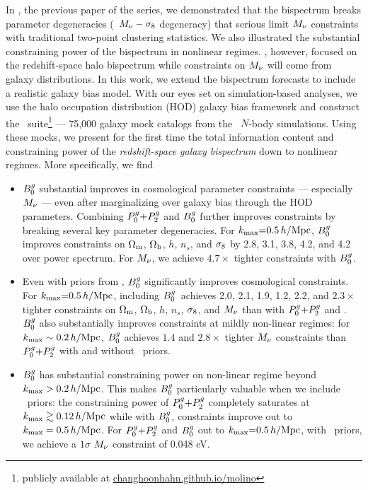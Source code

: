 In \cite{hahn2020}, the previous paper of the series, we demonstrated that the 
bispectrum breaks parameter degeneracies (\eg~$M_\nu-\sigma_8$ degeneracy) that 
serious limit $M_\nu$ constraints with traditional two-point clustering statistics. 
We also illustrated the substantial constraining power of the bispectrum in nonlinear regimes.
\cite{hahn2020}, however, focused on the redshift-space halo bispectrum while 
constraints on $M_\nu$ will come from galaxy distributions. %
In this work, we extend the \cite{hahn2020} bispectrum forecasts to
include a realistic galaxy bias model. With our eyes set on
simulation-based analyses, we use the halo occupation distribution (HOD) galaxy
bias framework and construct the \molino~suite\footnote{publicly available at
\href{changhoonhahn.github.io/molino}{changhoonhahn.github.io/molino}} ---
75,000 galaxy mock catalogs from the \quij~$N$-body 
simulations.  
Using these mocks, we present for the first time the total information
content and constraining power of the {\em redshift-space galaxy bispectrum} 
down to nonlinear regimes. More specifically, we find
\begin{itemize}
    \item $B^g_0$ substantial improves in cosmological parameter constraints ---
        especially $M_\nu$ --- even after marginalizing over galaxy bias through
        the HOD parameters. Combining $P^g_0{+}P^g_2$ and $B^g_0$ further improves
        constraints by breaking several key parameter degeneracies. For 
        $k_{\rm max}{=}0.5\,h/\mathrm{Mpc}$, $B^g_0$ improves constraints on 
        $\Omega_{\rm m}$, $\Omega_{\rm b}$, $h$, $n_s$, and $\sigma_8$ by 2.8, 3.1, 3.8, 4.2, and 4.2
        over power spectrum. For $M_\nu$, we achieve $4.7\times$ 
        tighter constraints with $B^g_0$.

    \item Even with priors from \planck, $B^g_0$ significantly improves
        cosmological constraints. For $k_{\rm max}{=}0.5\,h/\mathrm{Mpc}$, including 
        $B^g_0$~achieves 2.0, 2.1, 1.9, 1.2, 2.2, and $2.3\times$ tighter
        constraints on $\Omega_{\rm m}$, $\Omega_{\rm b}$, $h$, $n_s$, $\sigma_8$, and $M_\nu$ than with $P^g_0{+}P^g_2$
        and \planck. $B^g_0$ also substantially improves constraints at mildly non-linear regimes:
        for $k_{\rm max}\sim0.2\,h/\mathrm{Mpc}$, $B^g_0$ achieves $1.4$ and $2.8\times$ tighter
        $M_\nu$ constraints than $P^g_0{+}P^g_2$ with and without \planck~priors. 

    \item $B^g_0$ has substantial constraining power on non-linear regime beyond
        $k_{\rm max} > 0.2\,h/\mathrm{Mpc}$. This makes $B^g_0$ particularly valuable when we include
        \planck~priors: the constraining power of $P^g_0{+}P^g_2$ completely saturates 
        at $k_{\rm max} \gtrsim 0.12\,h/\mathrm{Mpc}$ while with $B^g_0$, constraints improve out to 
        $k_{\rm max}=0.5\,h/\mathrm{Mpc}$. For $P^g_0{+}P^g_2$ and $B^g_0$ out to $k_{\rm max}{=}0.5\,h/\mathrm{Mpc}$, with
        \planck~priors, we achieve a $1\sigma$ $M_\nu$ constraint of 0.048 eV.
\end{itemize}

